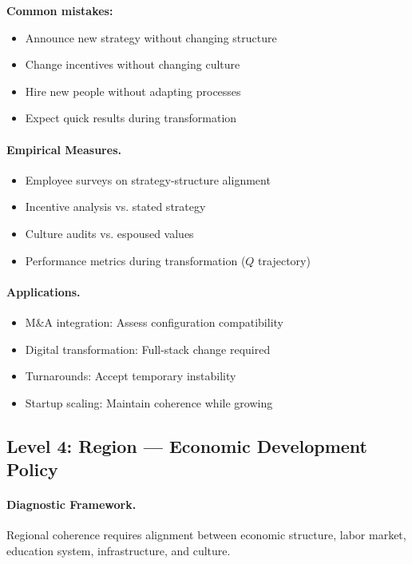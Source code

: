 \documentclass[12pt,a4paper]{article}
\begin{document}
\textbf{Common mistakes:}
\begin{itemize}
  \item Announce new strategy without changing structure
  \item Change incentives without changing culture
  \item Hire new people without adapting processes
  \item Expect quick results during transformation
\end{itemize}

\paragraph{Empirical Measures.}
\begin{itemize}
  \item Employee surveys on strategy-structure alignment
  \item Incentive analysis vs. stated strategy
  \item Culture audits vs. espoused values
  \item Performance metrics during transformation ($Q$ trajectory)
\end{itemize}

\paragraph{Applications.}
\begin{itemize}
  \item M\&A integration: Assess configuration compatibility
  \item Digital transformation: Full-stack change required
  \item Turnarounds: Accept temporary instability
  \item Startup scaling: Maintain coherence while growing
\end{itemize}

\subsection{Level 4: Region --- Economic Development Policy}

\paragraph{Diagnostic Framework.}
Regional coherence requires alignment between economic structure,
labor market, education system, infrastructure, and culture.
\end{document}
